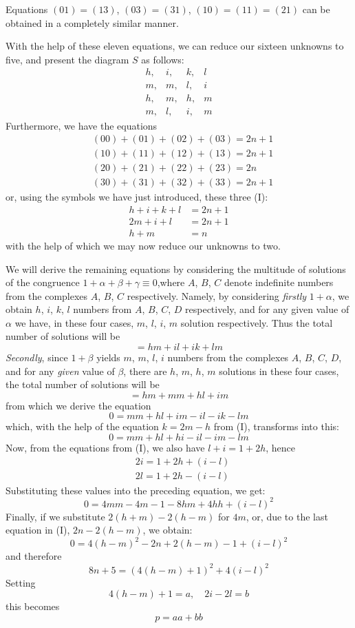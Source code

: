 \documentclass[twoside,12pt]{memoir}
\begin{document}
Equations \((01)=(13)\), \((03)=(31)\), \((10)=(11)=(21)\) can be obtained in a completely similar manner.
%

With the help of these eleven equations, we can reduce our sixteen unknowns to five, and present the diagram \(S\) as follows:
\[\begin{array}{llll}
h,&  i,& k,& l \\
m,& m,& l,& i \\
h,& m,& h,& m \\
m,& l,&  i,&  m
\end{array}\]
Furthermore, we have the equations
\[\begin{aligned}
& (00)+(01)+(02)+(03)=2 n+1 \\
& (10)+(11)+(12)+(13)=2 n+1 \\
& (20)+(21)+(22)+(23)=2 n \\
& (30)+(31)+(32)+(33)=2 n+1
\end{aligned}\]
or, using the symbols we have just introduced, these three (I):
\[\begin{aligned}
h+i+k+l & =2 n+1 \\
2 m+i+l & =2 n+1 \\
h+m & =n
\end{aligned}\]
with the help of which we may now reduce our unknowns to two.  
%

We will derive the remaining equations by considering the multitude of solutions of the congruence \(1+\alpha+\beta+\gamma \equiv 0\),where \(A\), \(B\), \(C\) denote indefinite numbers from the complexes \(A\), \(B\), \(C\) respectively. Namely, by considering \textit{firstly} \(1+\alpha\), we obtain \(h\), \(i\), \(k\), \(l\) numbers from \(A\), \(B\), \(C\), \(D\) respectively, and for any given value of \(\alpha\) we have, in these four cases, \(m\), \(l\), \(i\), \(m\) solution respectively.  Thus the total number of solutions will be
\[=hm+il+ik+lm\]
\textit{Secondly}, since \(1+\beta\) yields \(m\), \(m\), \(l\), \(i\) numbers from the complexes \(A\), \(B\), \(C\), \(D\), and for any \textit{given} value of \(\beta\), there are \(h\), \(m\), \(h\), \(m\) solutions in these four cases, the total number of solutions will be
\[=h m+m m+h l+i m\]
from which we derive the equation
\[0=m m+h l+i m-i l-i k-l m\]
which, with the help of the equation \(k=2m-h\) from (I), transforms into this:
\[0=m m+h l+h i-i l-i m-l m\]
Now, from the equations from (I), we also have \(l+i=1+2h\), hence
\[\begin{aligned}
& 2i=1+2h+(i-l) \\
& 2l=1+2h-(i-l)
\end{aligned}\]
Substituting these values into the preceding equation, we get:
\[0=4 m m-4 m-1-8 h m+4 h h+(i-l)^{2}\]
Finally, if we substitute \(2(h+m)-2(h-m)\) for \(4m\), or, due to the last equation in (I), \(2n-2(h-m)\), we obtain:
\[0=4(h-m)^{2}-2 n+2(h-m)-1+(i-l)^{2}\]
and therefore
\[8 n+5=(4(h-m)+1)^{2}+4(i-l)^{2}\]
Setting 
\[4(h-m)+1=a, \quad 2 i-2 l=b\]
this becomes
\[p=a a+b b\]
%
\end{document}
